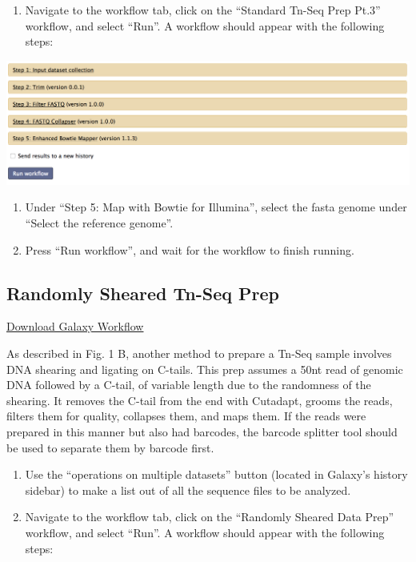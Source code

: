 \documentclass[11pt,]{article}
\providecommand{\tightlist}{%
  \setlength{\itemsep}{0pt}\setlength{\parskip}{0pt}}
\begin{document}
\begin{enumerate}
\def\labelenumi{\arabic{enumi}.}
\tightlist
\item
  Navigate to the workflow tab, click on the ``Standard Tn-Seq Prep
  Pt.3'' workflow, and select ``Run''. A workflow should appear with the
  following steps:
\end{enumerate}

\centerline{\includegraphics[width=0.8\linewidth]{figs/StandPrep3.png}}

\begin{enumerate}
\def\labelenumi{\arabic{enumi}.}
\setcounter{enumi}{1}
\tightlist
\item
  Under ``Step 5: Map with Bowtie for Illumina'', select the fasta
  genome under ``Select the reference genome''.
\item
  Press ``Run workflow'', and wait for the workflow to finish running.
\end{enumerate}

\subsection{Randomly Sheared Tn-Seq
Prep}\label{randomly-sheared-tn-seq-prep}

\href{https://raw.githubusercontent.com/vanOpijnenLab/magenta-p2/blob/master/workflows/Randomly\%20Sheared\%20Data\%20Prep.ga}{Download
Galaxy Workflow}

As described in Fig. 1 B, another method to prepare a Tn-Seq sample
involves DNA shearing and ligating on C-tails. This prep assumes a 50nt
read of genomic DNA followed by a C-tail, of variable length due to the
randomness of the shearing. It removes the C-tail from the end with
Cutadapt, grooms the reads, filters them for quality, collapses them,
and maps them. If the reads were prepared in this manner but also had
barcodes, the barcode splitter tool should be used to separate them by
barcode first.

\begin{enumerate}
\def\labelenumi{\arabic{enumi}.}
\tightlist
\item
  Use the ``operations on multiple datasets'' button (located in
  Galaxy's history sidebar) to make a list out of all the sequence files
  to be analyzed.
\item
  Navigate to the workflow tab, click on the ``Randomly Sheared Data
  Prep'' workflow, and select ``Run''. A workflow should appear with the
  following steps:
\end{enumerate}
\end{document}
